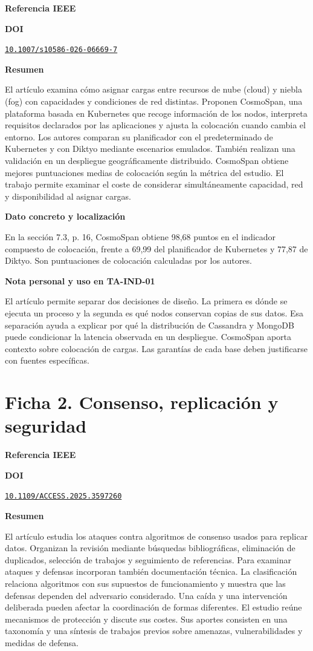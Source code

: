 \documentclass[11pt,a4paper]{article}
\newcommand{\fichabloque}[1]{\par\medskip\textbf{#1}\par\nobreak}
\newcommand{\ficharef}[1]{\begin{otherlanguage}{english}\fullcite{#1}\par\end{otherlanguage}}
\newcommand{\fichadoi}[1]{\href{https://doi.org/#1}{\nolinkurl{#1}}}
\begin{document}
\fichabloque{Referencia IEEE}
\ficharef{bregar2026cosmospan}

\fichabloque{DOI}
\fichadoi{10.1007/s10586-026-06669-7}

\fichabloque{Resumen}
El artículo examina cómo asignar cargas entre recursos de nube (cloud) y niebla (fog) con capacidades y condiciones de red distintas. Proponen CosmoSpan, una plataforma basada en Kubernetes que recoge información de los nodos, interpreta requisitos declarados por las aplicaciones y ajusta la colocación cuando cambia el entorno. Los autores comparan su planificador con el predeterminado de Kubernetes y con Diktyo mediante escenarios emulados. También realizan una validación en un despliegue geográficamente distribuido. CosmoSpan obtiene mejores puntuaciones medias de colocación según la métrica del estudio. El trabajo permite examinar el coste de considerar simultáneamente capacidad, red y disponibilidad al asignar cargas.

\fichabloque{Dato concreto y localización}
En la sección 7.3, p. 16, CosmoSpan obtiene 98,68 puntos en el indicador compuesto de colocación, frente a 69,99 del planificador de Kubernetes y 77,87 de Diktyo. Son puntuaciones de colocación calculadas por los autores.

\fichabloque{Nota personal y uso en TA-IND-01}
El artículo permite separar dos decisiones de diseño. La primera es dónde se ejecuta un proceso y la segunda es qué nodos conservan copias de sus datos. Esa separación ayuda a explicar por qué la distribución de Cassandra y MongoDB puede condicionar la latencia observada en un despliegue. CosmoSpan aporta contexto sobre colocación de cargas. Las garantías de cada base deben justificarse con fuentes específicas.

\clearpage
\section*{Ficha 2. Consenso, replicación y seguridad}

\fichabloque{Referencia IEEE}
\ficharef{mastromauro2025consenso}

\fichabloque{DOI}
\fichadoi{10.1109/ACCESS.2025.3597260}

\fichabloque{Resumen}
El artículo estudia los ataques contra algoritmos de consenso usados para replicar datos. Organizan la revisión mediante búsquedas bibliográficas, eliminación de duplicados, selección de trabajos y seguimiento de referencias. Para examinar ataques y defensas incorporan también documentación técnica. La clasificación relaciona algoritmos con sus supuestos de funcionamiento y muestra que las defensas dependen del adversario considerado. Una caída y una intervención deliberada pueden afectar la coordinación de formas diferentes. El estudio reúne mecanismos de protección y discute sus costes. Sus aportes consisten en una taxonomía y una síntesis de trabajos previos sobre amenazas, vulnerabilidades y medidas de defensa.
\end{document}
